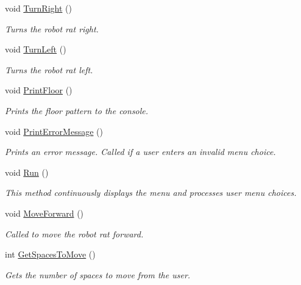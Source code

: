 \begin{DoxyCompactItemize}
void \hyperlink{class_robot_rat_1_1_robot_rat_a5a22d5ddbcd3f3a61a2e0533a0f08268}{Turn\+Right} ()
\begin{DoxyCompactList}\small\item\em Turns the robot rat right. \end{DoxyCompactList}\item 
void \hyperlink{class_robot_rat_1_1_robot_rat_ae30b7b42b70879f585fb8547d072c36d}{Turn\+Left} ()
\begin{DoxyCompactList}\small\item\em Turns the robot rat left. \end{DoxyCompactList}\item 
void \hyperlink{class_robot_rat_1_1_robot_rat_ae4f305c798227eb610474740577ad39a}{Print\+Floor} ()
\begin{DoxyCompactList}\small\item\em Prints the floor pattern to the console. \end{DoxyCompactList}\item 
void \hyperlink{class_robot_rat_1_1_robot_rat_af8940f3489ad809f6114586f7f0bf175}{Print\+Error\+Message} ()
\begin{DoxyCompactList}\small\item\em Prints an error message. Called if a user enters an invalid menu choice. \end{DoxyCompactList}\item 
void \hyperlink{class_robot_rat_1_1_robot_rat_afeacab1cc8ebc4861c25e46066aa3279}{Run} ()
\begin{DoxyCompactList}\small\item\em This method continuously displays the menu and processes user menu choices. \end{DoxyCompactList}\item 
void \hyperlink{class_robot_rat_1_1_robot_rat_acf0779d0c533f2708a07e24f828fd1ea}{Move\+Forward} ()
\begin{DoxyCompactList}\small\item\em Called to move the robot rat forward. \end{DoxyCompactList}\item 
int \hyperlink{class_robot_rat_1_1_robot_rat_a6673cf7c35679aea0e7784b3e516b4e0}{Get\+Spaces\+To\+Move} ()
\begin{DoxyCompactList}\small\item\em Gets the number of spaces to move from the user. \end{DoxyCompactList}\end{DoxyCompactItemize}
